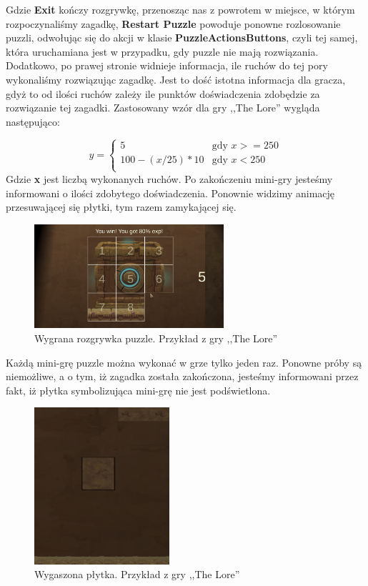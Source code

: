 \documentclass[oneside,polski,logo]{amuthesis}
\begin{document}
Gdzie \textbf{Exit} kończy rozgrywkę, przenosząc nas z powrotem w miejsce, w którym rozpoczynaliśmy zagadkę, \textbf{Restart Puzzle} powoduje ponowne rozlosowanie puzzli, odwołując się do akcji w klasie \textbf{PuzzleActionsButtons}, czyli tej samej, która uruchamiana jest w przypadku, gdy puzzle nie mają rozwiązania. Dodatkowo, po prawej stronie widnieje informacja, ile ruchów do tej pory wykonaliśmy rozwiązując zagadkę. Jest to dość istotna informacja dla gracza, gdyż to od ilości ruchów zależy ile punktów doświadczenia zdobędzie za rozwiązanie tej zagadki. Zastosowany wzór dla gry ,,The Lore'' wygląda następująco:

$$
y = \left\{ \begin{array}{ll}
5 & \textrm{gdy $x>=250$}\\
100 - (x / 25) * 10 & \textrm{gdy $x<250$}\\
\end{array} \right.
$$
Gdzie \textbf{x} jest liczbą wykonanych ruchów.
Po zakończeniu mini-gry jesteśmy informowani o ilości zdobytego doświadczenia. Ponownie widzimy animację przesuwającej się płytki, tym razem zamykającej się.
\begin{figure}[h]
	\centering
	\includegraphics[width=7cm]{images/tyrek/puzzle_end.png}
	\caption{Wygrana rozgrywka puzzle. Przykład z gry ,,The Lore''}
\end{figure}

Każdą mini-grę puzzle można wykonać w grze tylko jeden raz. Ponowne próby są niemożliwe, a o tym, iż zagadka została zakończona, jesteśmy informowani przez fakt, iż płytka symbolizująca mini-grę nie jest podświetlona.

\begin{figure}[h]
	\centering
	\includegraphics[width=5cm]{images/tyrek/puzzleWin.png}
	\caption{Wygaszona płytka. Przykład z gry ,,The Lore''}
\end{figure}
\end{document}
